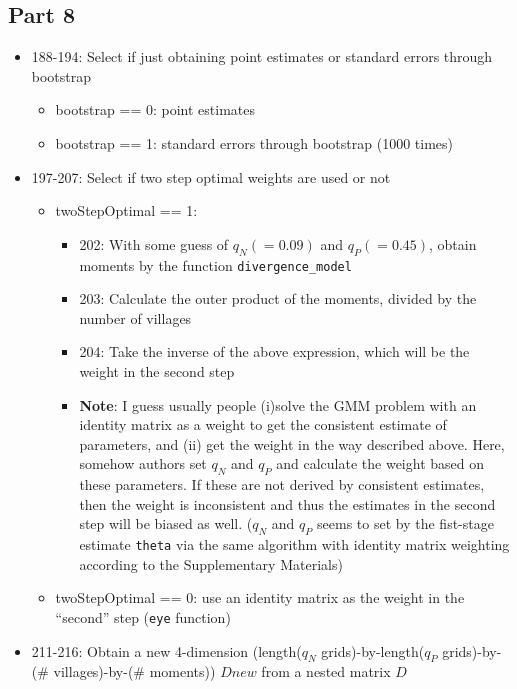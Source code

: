 \documentclass[10pt,letterpaper]{article}
\begin{document}
\subsection*{Part 8}
\begin{itemize}
  \item 188-194: Select if just obtaining point estimates or standard errors through bootstrap
    \begin{itemize}
      \item bootstrap == 0: point estimates
      \item bootstrap == 1: standard errors through bootstrap (1000 times)
    \end{itemize}
  \item 197-207: Select if two step optimal weights are used or not
    \begin{itemize}
      \item twoStepOptimal == 1: 
        \begin{itemize}
          \item 202: With some guess of $q_N (= 0.09)$ and $q_P (= 0.45)$, obtain moments by the function \texttt{divergence\_model}
          \item 203: Calculate the outer product of the moments, divided by the number of villages
          \item 204: Take the inverse of the above expression, which will be the weight in the second step
          \item \textbf{Note}: I guess usually people 
            (i)solve the GMM problem with an identity matrix as a weight to get the consistent estimate of parameters, and 
            (ii) get the weight in the way described above.
            Here, somehow authors set $q_N$ and $q_P$ and calculate the weight based on these parameters.
            If these are not derived by consistent estimates, then the weight is inconsistent and thus the estimates in the second step will be biased as well. ($q_N$ and $q_P$ seems to set by the fist-stage estimate \texttt{theta} via the same algorithm with identity matrix weighting according to the Supplementary Materials)
        \end{itemize}
      \item twoStepOptimal == 0: use an identity matrix as the weight in the ``second'' step (\texttt{eye} function)
    \end{itemize}
  \item 211-216: Obtain a new 4-dimension (length($q_N$ grids)-by-length($q_P$ grids)-by-(\# villages)-by-(\# moments))   $Dnew$ from a nested matrix $D$

\end{itemize}
\end{document}
